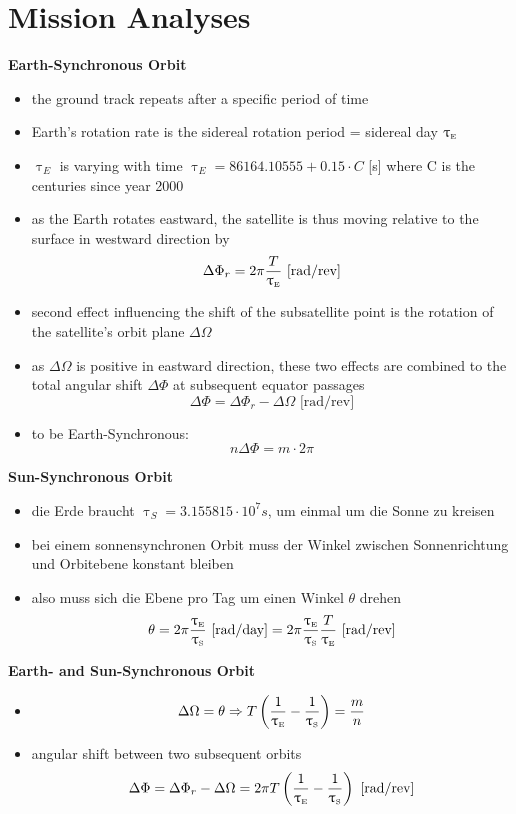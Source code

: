 \documentclass[a4paper,10pt]{article}
\newcommand{\f}{\textbf}
\begin{document}
\section{Mission Analyses}
\f{Earth-Synchronous Orbit}
\begin{itemize}
 \item the ground track repeats after a specific period of time
 \item Earth's rotation rate is the sidereal rotation period = sidereal day $\uptau_{\text{\tiny{E}}}$
 \item $\uptau_E$ is varying with time $\uptau_E = 86164.10555+0.15\cdot C$ [s] where C is the centuries since year 2000
 \item as the Earth rotates eastward, the satellite is thus moving relative to the surface in westward direction by 
 \[\Delta \Phi_r = 2\pi\frac{T}{\uptau_{\text{\tiny{E}}}} \text{ [rad/rev]}\] 
 \item second effect influencing the shift of the subsatellite point is the rotation of the satellite's orbit plane $\Delta \Omega$
 \item as $\Delta \Omega$ is positive in eastward direction, these two effects are combined to the total angular shift $\Delta \Phi$ at subsequent equator 
 passages \[\Delta \Phi = \Delta \Phi_r - \Delta \Omega \text{ [rad/rev]}\]
 \item to be Earth-Synchronous: 
 \[n\Delta \Phi = m \cdot 2\pi\]
\end{itemize}
\f{Sun-Synchronous Orbit}
\begin{itemize}
 \item die Erde braucht $\uptau_S = 3.155815\cdot 10^7 s$, um einmal um die Sonne zu kreisen 
 \item bei einem sonnensynchronen Orbit muss der Winkel zwischen Sonnenrichtung und Orbitebene konstant bleiben 
 \item also muss sich die Ebene pro Tag um einen Winkel $\theta$ drehen 
 \[\theta = 2\pi\frac{\uptau_{\text{\tiny{E}}}}{\uptau_{\text{\tiny{S}}}} \text{ [rad/day]} = 2\pi\frac{\uptau_{\text{\tiny{E}}}}{\uptau_{\text{\tiny{S}}}}\frac{T}{\uptau_{\text{\tiny{E}}}} \text{ [rad/rev]}\]
\end{itemize}
\f{Earth- and Sun-Synchronous Orbit}
\begin{itemize}
 \item \[\Delta \Omega = \theta \Rightarrow T\left(\frac{1}{\uptau_{\text{\tiny{E}}}} - \frac{1}{\uptau_{\text{\tiny{S}}}}\right) = \frac{m}{n}\]
 \item angular shift between two subsequent orbits 
 \[\Delta \Phi = \Delta \Phi_r - \Delta \Omega = 2\pi T\left(\frac{1}{\uptau_{\text{\tiny{E}}}} - \frac{1}{\uptau_{\text{\tiny{S}}}}\right) \text{ [rad/rev]}\]
\end{itemize}
\end{document}
